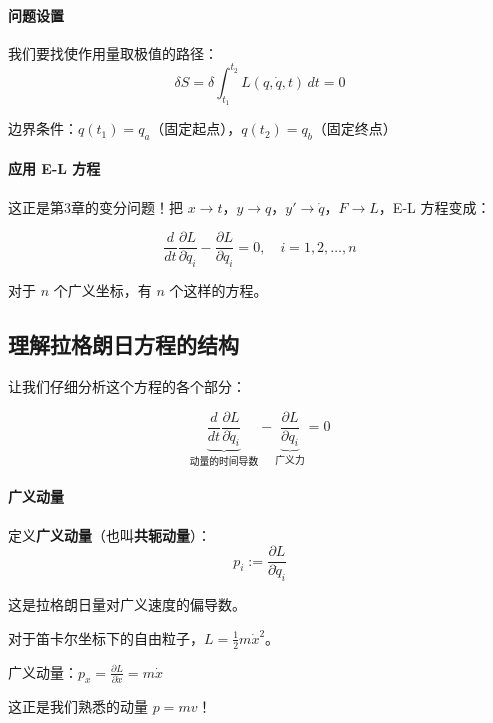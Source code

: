 \paragraph{问题设置}

我们要找使作用量取极值的路径：
\[
\delta S = \delta \int_{t_1}^{t_2} L(q, \dot{q}, t) \, dt = 0
\]

边界条件：$q(t_1) = q_a$（固定起点），$q(t_2) = q_b$（固定终点）

\paragraph{应用 E-L 方程}

这正是第3章的变分问题！把 $x \to t$，$y \to q$，$y' \to \dot{q}$，$F \to L$，E-L 方程变成：

\begin{keyformula}[title=拉格朗日方程]
\begin{equation}
\boxed{\frac{d}{dt}\frac{\partial L}{\partial \dot{q}_i} - \frac{\partial L}{\partial q_i} = 0, \quad i = 1, 2, \ldots, n}
\end{equation}

对于 $n$ 个广义坐标，有 $n$ 个这样的方程。
\end{keyformula}

\subsection{理解拉格朗日方程的结构}

让我们仔细分析这个方程的各个部分：

\[
\underbrace{\frac{d}{dt}\frac{\partial L}{\partial \dot{q}_i}}_{\text{动量的时间导数}} - \underbrace{\frac{\partial L}{\partial q_i}}_{\text{广义力}} = 0
\]

\paragraph{广义动量}

定义\textbf{广义动量}（也叫\textbf{共轭动量}）：
\begin{equation}
p_i := \frac{\partial L}{\partial \dot{q}_i}
\end{equation}

这是拉格朗日量对广义速度的偏导数。

\begin{example}[普通动量是广义动量的特例]
对于笛卡尔坐标下的自由粒子，$L = \frac{1}{2}m\dot{x}^2$。

广义动量：$p_x = \frac{\partial L}{\partial \dot{x}} = m\dot{x}$

这正是我们熟悉的动量 $p = mv$！
\end{example}

